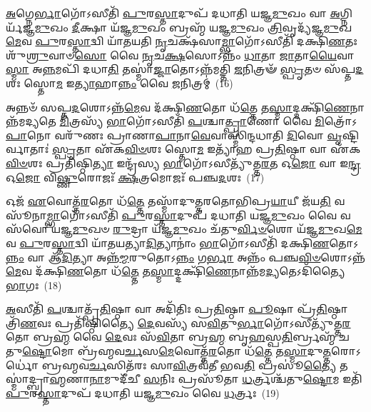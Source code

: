 {\anuvakamend[{𑌵𑍈 \ul{𑌤𑍍𑌰𑌿}\-𑌵𑍃𑌦𑌿𑌤𑌿᳴ \ul{𑌪𑍁}\-𑌰𑌸𑍍𑌤𑌾॑\-\ul{𑌥𑍍𑌸}\-𑌵𑍍𑌯𑌸𑍍𑌤𑍍𑌰᳴𑌯𑍋\-\ul{𑌵𑌿}\-\-\ul{𑍞}\-𑌶 𑌇𑌤𑌿᳴ 𑌸𑍁\-\ul{𑌵}\-𑌰𑍍𑌗𑍋 𑌵𑍈 𑌪𑌞𑍍𑌚᳴ 𑌚}]}%

\-\ul{𑌅}\-𑌗𑍍𑌨𑍇\-\ul{𑌰𑍍𑌭𑌾}\-𑌗𑍋᳴\-𑌽𑌸𑍀𑌤𑌿᳴ \ul{𑌪𑍁}\-𑌰\-\ul{𑌸𑍍𑌤𑌾}\-𑌦𑍁𑌪᳴ 𑌦𑌧𑌾𑌤𑌿 𑌯𑌜𑍍𑌞\-\ul{𑌮𑍁}\-𑌖𑌂 𑌵𑌾 \ul{𑌅}\-𑌗𑍍𑌨𑌿𑌰𑍍𑌯᳴𑌜𑍍𑌞\-\ul{𑌮𑍁}\-𑌖𑌂 \ul{𑌦𑍀}\-𑌕𑍍𑌷𑌾 𑌯᳴𑌜𑍍𑌞\-\ul{𑌮𑍁}\-𑌖𑌂 𑌬𑍍𑌰𑌹𑍍𑌮᳴ 𑌯𑌜𑍍𑌞\-\ul{𑌮𑍁}\-𑌖𑌂 \ul{𑌤𑍍𑌰𑌿}\-𑌵𑍃𑌦𑍍𑌯᳴𑌜𑍍𑌞\-\ul{𑌮𑍁}\-𑌖\-\ul{𑌮𑍇}\-𑌵 \ul{𑌪𑍁}\-𑌰\-\ul{𑌸𑍍𑌤𑌾}\-𑌦𑍍𑌵𑌿 𑌯𑌾᳴𑌤𑌯𑌤𑌿 \ul{𑌨𑍃}\-𑌚𑌕𑍍𑌷᳴𑌸𑌾\-\ul{𑌮𑍍𑌭𑌾}\-𑌗𑍋᳴\-𑌽𑌸𑍀𑌤𑌿᳴ 𑌦𑌕𑍍𑌷𑌿\-\ul{𑌣}\-𑌤𑌃 𑌶𑍁᳴\-\ul{𑌶𑍍𑌰𑍁}\-𑌵𑌾𑍞\-\ul{𑌸𑍋} 𑌵𑍈 \ul{𑌨𑍃}\-𑌚\-\ul{𑌕𑍍𑌷}\-𑌸𑍋\-𑌽𑌨𑍍𑌨𑌂᳴ \ul{𑌧𑌾}\-𑌤𑌾 \ul{𑌜𑌾}\-𑌤𑌾\-\ul{𑌯𑍈}\-𑌵𑌾\-\ul{𑌸𑍍𑌮𑌾} 𑌅\-\ul{𑌨𑍍𑌨}\-𑌮𑌪𑌿᳴ 𑌦𑌧𑌾\-\ul{𑌤𑌿} 𑌤𑌸𑍍𑌮𑌾॑\-\ul{𑌜𑍍𑌜𑌾}\-𑌤𑍋\-𑌽𑌨𑍍𑌨᳴𑌮𑌤𑍍𑌤𑌿 \ul{𑌜}\-𑌨𑌿𑌤𑍍𑌰𑍟᳴ \ul{𑌸𑍍𑌪𑍃}\-𑌤𑍞 𑌸᳴𑌪𑍍𑌤\-\ul{𑌦}\-𑌶𑌃 𑌸𑍍𑌤𑍋\-\ul{𑌮} 𑌇\-\ul{𑌤𑍍𑌯𑌾}\-𑌹𑌾\-\ul{𑌨𑍍𑌨𑌂} 𑌵𑍈 \ul{𑌜}\-𑌨𑌿𑌤𑍍𑌰𑌮𑍍॑~(16)

𑌅𑌨𑍍𑌨𑍞᳴ 𑌸𑌪𑍍𑌤\-\ul{𑌦}\-𑌶𑍋\-𑌽𑌨𑍍𑌨᳴\-\ul{𑌮𑍇}\-𑌵 𑌦᳴𑌕𑍍𑌷𑌿\-\ul{𑌣}\-𑌤𑍋 𑌧᳴\-\ul{𑌤𑍍𑌤𑍇} 𑌤\-\ul{𑌸𑍍𑌮𑌾}\-𑌦𑍍𑌦𑌕𑍍𑌷𑌿᳴\-\ul{𑌣𑍇}\-𑌨𑌾𑌨𑍍𑌨᳴𑌮𑌦𑍍𑌯𑌤𑍇 \ul{𑌮𑌿}\-𑌤𑍍𑌰𑌸𑍍𑌯᳴ \ul{𑌭𑌾}\-𑌗𑍋᳴\-𑌽𑌸𑍀𑌤𑌿᳴ \ul{𑌪}\-𑌶𑍍𑌚𑌾\-\ul{𑌤𑍍𑌪𑍍𑌰𑌾}\-𑌣𑍋 𑌵𑍈 \ul{𑌮𑌿}\-𑌤𑍍𑌰𑍋᳴\-𑌽\-\ul{𑌪𑌾}\-𑌨𑍋 𑌵𑌰𑍁᳴𑌣𑌃 𑌪𑍍𑌰𑌾𑌣𑌾\-\ul{𑌪𑌾}\-𑌨𑌾\-\ul{𑌵𑍇}\-𑌵𑌾𑌸𑍍𑌮𑌿᳴𑌨𑍍𑌦𑌧𑌾𑌤𑌿 \ul{𑌦𑌿}\-𑌵𑍋 \ul{𑌵𑍃}\-𑌷𑍍𑌟𑌿𑌰𑍍𑌵𑌾𑌤𑌾𑌃॑ \ul{𑌸𑍍𑌪𑍃}\-𑌤𑌾 𑌏᳴𑌕\-\ul{𑌵𑌿}\-\-\ul{𑍞}\-𑌶𑌃 𑌸𑍍𑌤𑍋\-\ul{𑌮} 𑌇𑌤𑍍𑌯𑌾᳴𑌹 𑌪𑍍𑌰\-\ul{𑌤𑌿}\-𑌷𑍍𑌠𑌾 𑌵𑌾 𑌏᳴𑌕\-\ul{𑌵𑌿}\-\-\ul{𑍞}\-𑌶𑌃 𑌪𑍍𑌰𑌤𑌿᳴𑌷𑍍𑌠𑌿\-\ul{𑌤𑍍𑌯𑌾} 𑌇𑌨𑍍𑌦𑍍𑌰᳴𑌸𑍍𑌯 \ul{𑌭𑌾}\-𑌗𑍋᳴\-𑌽𑌸𑍀𑌤𑍍𑌯𑍁᳴𑌤𑍍𑌤\-\ul{𑌰}\-𑌤 𑌓\-\ul{𑌜𑍋} 𑌵𑌾 𑌇\-\ul{𑌨𑍍𑌦𑍍𑌰} 𑌓\-\ul{𑌜𑍋} 𑌵𑌿\-\ul{𑌷𑍍𑌣𑍁}\-𑌰𑍋𑌜𑌃᳴ \ul{𑌕𑍍𑌷}\-𑌤𑍍𑌰𑌮𑍋𑌜𑌃᳴ 𑌪𑌞𑍍𑌚\-\ul{𑌦}\-𑌶𑌃~(17)

𑌓𑌜᳴ \ul{𑌏}\-𑌵𑍋𑌤𑍍𑌤᳴\-\ul{𑌰}\-𑌤𑍋 𑌧᳴\-\ul{𑌤𑍍𑌤𑍇} 𑌤𑌸𑍍𑌮𑌾᳴𑌦𑍁𑌤𑍍𑌤𑌰𑌤𑍋𑌭𑌿𑌪𑍍𑌰\-\ul{𑌯𑌾}\-𑌯𑍀 𑌜᳴𑌯\-\ul{𑌤𑌿} 𑌵𑌸𑍂᳴𑌨𑌾\-\ul{𑌮𑍍𑌭𑌾}\-𑌗𑍋᳴\-𑌽𑌸𑍀𑌤𑌿᳴ \ul{𑌪𑍁}\-𑌰\-\ul{𑌸𑍍𑌤𑌾}\-𑌦𑍁𑌪᳴ 𑌦𑌧𑌾𑌤𑌿 𑌯𑌜𑍍𑌞\-\ul{𑌮𑍁}\-𑌖𑌂 𑌵𑍈 𑌵𑌸᳴𑌵𑍋 ᳴𑌯𑌜𑍍𑌞\-\ul{𑌮𑍁}\-𑌖𑍞 \ul{𑌰𑍁}\-𑌦𑍍𑌰𑌾 𑌯᳴𑌜𑍍𑌞\-\ul{𑌮𑍁}\-𑌖𑌂 𑌚᳴𑌤𑍁\-\ul{𑌰𑍍𑌵𑌿}\-\-\ul{𑍞}\-𑌶𑍋 𑌯᳴𑌜𑍍𑌞\-\ul{𑌮𑍁}\-𑌖\-\ul{𑌮𑍇}\-𑌵 \ul{𑌪𑍁}\-𑌰\-\ul{𑌸𑍍𑌤𑌾}\-𑌦𑍍𑌵𑌿 𑌯𑌾᳴𑌤𑌯𑌤𑍍𑌯𑌾\-\ul{𑌦𑌿}\-𑌤𑍍𑌯𑌾𑌨𑌾𑌂॑ \ul{𑌭𑌾}\-𑌗𑍋᳴\-𑌽𑌸𑍀𑌤𑌿᳴ 𑌦𑌕𑍍𑌷𑌿\-\ul{𑌣}\-𑌤𑍋\-𑌽\-\ul{𑌨𑍍𑌨𑌂} 𑌵𑌾 𑌆᳴\-\ul{𑌦𑌿}\-𑌤𑍍𑌯𑌾 𑌅𑌨𑍍𑌨᳴\-\ul{𑌮𑍍𑌮}\-𑌰𑍁𑌤𑍋\-𑌽\-\ul{𑌨𑍍𑌨𑌂} 𑌗\-\ul{𑌰𑍍𑌭𑌾} 𑌅𑌨𑍍𑌨𑌂᳴ 𑌪𑌞𑍍𑌚\-\ul{𑌵𑌿}\-\-\ul{𑍞}\-𑌶𑍋\-𑌽𑌨𑍍𑌨᳴\-\ul{𑌮𑍇}\-𑌵 𑌦᳴𑌕𑍍𑌷𑌿\-\ul{𑌣}\-𑌤𑍋 𑌧᳴\-\ul{𑌤𑍍𑌤𑍇} 𑌤\-\ul{𑌸𑍍𑌮𑌾}\-𑌦𑍍𑌦𑌕𑍍𑌷𑌿᳴\-\ul{𑌣𑍇}\-𑌨𑌾𑌨𑍍𑌨᳴𑌮\-\ul{𑌦𑍍𑌯}\-𑌤𑍇\-𑌽𑌦𑌿᳴𑌤𑍍𑌯𑍈 \ul{𑌭𑌾}\-𑌗𑌃~(18)

\-\ul{𑌅}\-𑌸𑍀𑌤𑌿᳴ \ul{𑌪}\-𑌶𑍍𑌚𑌾𑌤𑍍𑌪𑍍𑌰᳴\-\ul{𑌤𑌿}\-𑌷𑍍𑌠𑌾 𑌵𑌾 𑌅𑌦𑌿᳴𑌤𑌿𑌃 𑌪𑍍𑌰\-\ul{𑌤𑌿}\-𑌷𑍍𑌠𑌾 \ul{𑌪𑍂}\-𑌷𑌾 𑌪𑍍𑌰᳴\-\ul{𑌤𑌿}\-𑌷𑍍𑌠𑌾 𑌤𑍍𑌰𑌿᳴\-\ul{𑌣}\-𑌵𑌃 𑌪𑍍𑌰𑌤𑌿᳴𑌷𑍍𑌠𑌿𑌤𑍍𑌯𑍈 \ul{𑌦𑍇}\-𑌵𑌸𑍍𑌯᳴ 𑌸\-\ul{𑌵𑌿}\-𑌤𑍁\-\ul{𑌰𑍍𑌭𑌾}\-𑌗𑍋᳴\-𑌽𑌸𑍀𑌤𑍍𑌯𑍁᳴𑌤𑍍𑌤\-\ul{𑌰}\-𑌤𑍋 𑌬𑍍𑌰\-\ul{𑌹𑍍𑌮} 𑌵𑍈 \ul{𑌦𑍇}\-𑌵𑌃 𑌸᳴\-\ul{𑌵𑌿}\-𑌤𑌾 𑌬𑍍𑌰\-\ul{𑌹𑍍𑌮} 𑌬𑍃\-\ul{𑌹}\-𑌸𑍍𑌪\-\ul{𑌤𑌿}\-𑌰𑍍𑌬𑍍𑌰𑌹𑍍𑌮᳴ 𑌚𑌤𑍁\-\ul{𑌷𑍍𑌟𑍋}\-𑌮𑍋 𑌬𑍍𑌰᳴𑌹𑍍𑌮𑌵\-\ul{𑌰𑍍𑌚}\-𑌸\-\ul{𑌮𑍇}\-𑌵𑍋𑌤𑍍𑌤᳴\-\ul{𑌰}\-𑌤𑍋 𑌧᳴\-\ul{𑌤𑍍𑌤𑍇} 𑌤\-\ul{𑌸𑍍𑌮𑌾}\-𑌦𑍁\-\ul{𑌤𑍍𑌤}\-𑌰𑍋\-𑌽𑌰𑍍𑌧𑍋॑ 𑌬𑍍𑌰𑌹𑍍𑌮𑌵\-\ul{𑌰𑍍𑌚}\-𑌸𑌿𑌤᳴𑌰𑌃 𑌸𑌾\-\ul{𑌵𑌿}\-𑌤𑍍𑌰𑌵᳴𑌤𑍀 𑌭𑌵\-\ul{𑌤𑌿} 𑌪𑍍𑌰𑌸𑍂॑\-\ul{𑌤𑍍𑌯𑍈} 𑌤𑌸𑍍𑌮𑌾॑𑌦𑍍𑌬𑍍𑌰𑌾\-\ul{𑌹𑍍𑌮}\-𑌣𑌾\-\ul{𑌨𑌾}\-𑌮𑍁𑌦𑍀᳴𑌚𑍀 \ul{𑌸}\-𑌨𑌿𑌃 𑌪𑍍𑌰𑌸𑍂᳴𑌤𑌾 \ul{𑌧}\-𑌰𑍍𑌤𑍍𑌰𑌶𑍍𑌚᳴𑌤𑍁\-\ul{𑌷𑍍𑌟𑍋}\-𑌮 𑌇𑌤𑌿᳴ \ul{𑌪𑍁}\-𑌰\-\ul{𑌸𑍍𑌤𑌾}\-𑌦𑍁𑌪᳴ 𑌦𑌧𑌾𑌤𑌿 𑌯𑌜𑍍𑌞\-\ul{𑌮𑍁}\-𑌖𑌂 𑌵𑍈 \ul{𑌧}\-𑌰𑍍𑌤𑍍𑌰𑌃~(19)

